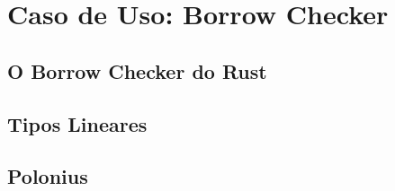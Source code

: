 \chapter{Caso de Uso: Borrow Checker}

\section{O Borrow Checker do Rust}

\section{Tipos Lineares}

\section{Polonius}
